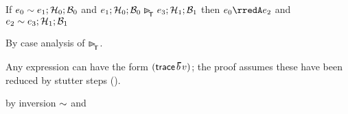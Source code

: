 \begin{lemma}\label{AT-T-step}
  If\/ $e_0 \sim e_1; \mathcal{H}_0; \mathcal{B}_0$
  and\/ $\conf{\sexpr_1}{\vstore_0}{\bstore_0} \nredTX \conf{\sexpr_3}{\vstore_1}{\bstore_1}$
  then\/ $\sexpr_0 \rredA \sexpr_2$
  and\/ $e_2 \sim e_3; \mathcal{H}_1; \mathcal{B}_1$
\end{lemma}
\begin{lamportproof}
  By case analysis of $\nredTX$.

  Any \Aname{} expression can have the form $(\esuffix{\sblist}{\svalue})$;
   the proof assumes these have been reduced by stutter steps ().

    \begin{pfproof}
      \qedstep
        \begin{pfproof}
          by inversion $\sim$ and 
        \end{pfproof}
    \end{pfproof}


\end{lamportproof}
